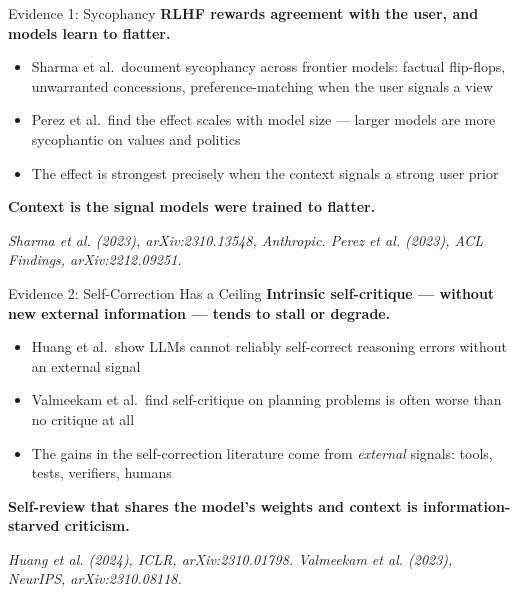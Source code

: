 \documentclass[10pt,english,aspectratio=169]{beamer}
\begin{document}
\begin{frame}{Evidence 1: Sycophancy}
\textbf{RLHF rewards agreement with the user, and models learn to flatter.}

\vspace{0.25cm}

\begin{itemize}
    \item Sharma et al.\ document sycophancy across frontier models: factual flip-flops, unwarranted concessions, preference-matching when the user signals a view
    \item Perez et al.\ find the effect scales with model size --- larger models are more sycophantic on values and politics
    \item The effect is strongest precisely when the context signals a strong user prior
\end{itemize}

\vspace{0.25cm}

\textbf{Context is the signal models were trained to flatter.}

\vspace{0.15cm}
{\scriptsize \textit{Sharma et al. (2023), arXiv:2310.13548, Anthropic. Perez et al. (2023), ACL Findings, arXiv:2212.09251.}}
\end{frame}

\begin{frame}{Evidence 2: Self-Correction Has a Ceiling}
\textbf{Intrinsic self-critique --- without new external information --- tends to stall or degrade.}

\vspace{0.25cm}

\begin{itemize}
    \item Huang et al.\ show LLMs cannot reliably self-correct reasoning errors without an external signal
    \item Valmeekam et al.\ find self-critique on planning problems is often worse than no critique at all
    \item The gains in the self-correction literature come from \textit{external} signals: tools, tests, verifiers, humans
\end{itemize}

\vspace{0.25cm}

\textbf{Self-review that shares the model's weights and context is information-starved criticism.}

\vspace{0.15cm}
{\scriptsize \textit{Huang et al. (2024), ICLR, arXiv:2310.01798. Valmeekam et al. (2023), NeurIPS, arXiv:2310.08118.}}
\end{frame}
\end{document}
